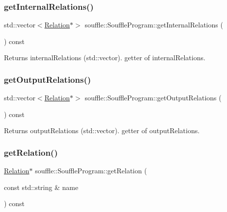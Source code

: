 \subsubsection{\texorpdfstring{get\+Internal\+Relations()}{getInternalRelations()}}
{\footnotesize\ttfamily std\+::vector$<$\hyperlink{classsouffle_1_1_relation}{Relation}$\ast$$>$ souffle\+::\+Souffle\+Program\+::get\+Internal\+Relations (\begin{DoxyParamCaption}{ }\end{DoxyParamCaption}) const\hspace{0.3cm}{\ttfamily [inline]}}

\begin{DoxyReturn}{Returns}
internal\+Relations (std\+::vector). getter of internal\+Relations. 
\end{DoxyReturn}
\mbox{\label{classsouffle_1_1_souffle_program_af7cfe2c44299205ef9b702f7dc4c9357}} 
\subsubsection{\texorpdfstring{get\+Output\+Relations()}{getOutputRelations()}}
{\footnotesize\ttfamily std\+::vector$<$\hyperlink{classsouffle_1_1_relation}{Relation}$\ast$$>$ souffle\+::\+Souffle\+Program\+::get\+Output\+Relations (\begin{DoxyParamCaption}{ }\end{DoxyParamCaption}) const\hspace{0.3cm}{\ttfamily [inline]}}

\begin{DoxyReturn}{Returns}
output\+Relations (std\+::vector). getter of output\+Relations. 
\end{DoxyReturn}
\mbox{\label{classsouffle_1_1_souffle_program_a8a5b114c5b6c8022c936a533248996e7}} 
\subsubsection{\texorpdfstring{get\+Relation()}{getRelation()}}
{\footnotesize\ttfamily \hyperlink{classsouffle_1_1_relation}{Relation}$\ast$ souffle\+::\+Souffle\+Program\+::get\+Relation (\begin{DoxyParamCaption}\item[{const std\+::string \&}]{name }\end{DoxyParamCaption}) const\hspace{0.3cm}{\ttfamily [inline]}}


